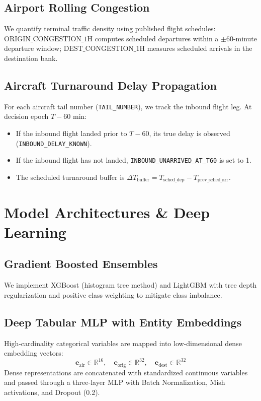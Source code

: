 \documentclass[conference]{IEEEtran}
\begin{document}
\subsection{Airport Rolling Congestion}
We quantify terminal traffic density using published flight schedules: $\text{ORIGIN\_CONGESTION\_1H}$ computes scheduled departures within a $\pm 60$-minute departure window; $\text{DEST\_CONGESTION\_1H}$ measures scheduled arrivals in the destination bank.
\subsection{Aircraft Turnaround Delay Propagation}
For each aircraft tail number (\texttt{TAIL\_NUMBER}), we track the inbound flight leg. At decision epoch $T - 60$ min:
\begin{itemize}
    \item If the inbound flight landed prior to $T - 60$, its true delay is observed (\texttt{INBOUND\_DELAY\_KNOWN}).
    \item If the inbound flight has not landed, \texttt{INBOUND\_UNARRIVED\_AT\_T60} is set to 1.
    \item The scheduled turnaround buffer is $\Delta T_{\text{buffer}} = T_{\text{sched\_dep}} - T_{\text{prev\_sched\_arr}}$.
\end{itemize}

\section{Model Architectures \& Deep Learning}
\subsection{Gradient Boosted Ensembles}
We implement XGBoost (histogram tree method) and LightGBM with tree depth regularization and positive class weighting to mitigate class imbalance.
\subsection{Deep Tabular MLP with Entity Embeddings}
High-cardinality categorical variables are mapped into low-dimensional dense embedding vectors:
\begin{equation}
\mathbf{e}_{\text{air}} \in \mathbb{R}^{16}, \quad \mathbf{e}_{\text{orig}} \in \mathbb{R}^{32}, \quad \mathbf{e}_{\text{dest}} \in \mathbb{R}^{32}
\end{equation}
Dense representations are concatenated with standardized continuous variables and passed through a three-layer MLP with Batch Normalization, Mish activations, and Dropout (0.2).
\end{document}
